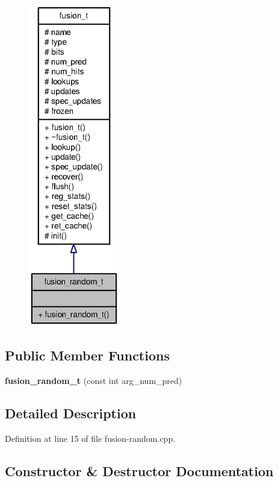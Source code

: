 \begin{figure}[H]
\begin{center}
\leavevmode
\includegraphics[height=400pt]{classfusion__random__t__coll__graph}
\end{center}
\end{figure}
\subsection*{Public Member Functions}
\begin{CompactItemize}
\item 
{\bf fusion\_\-random\_\-t} (const int arg\_\-num\_\-pred)
\end{CompactItemize}


\subsection{Detailed Description}


Definition at line 15 of file fusion-random.cpp.

\subsection{Constructor \& Destructor Documentation}
